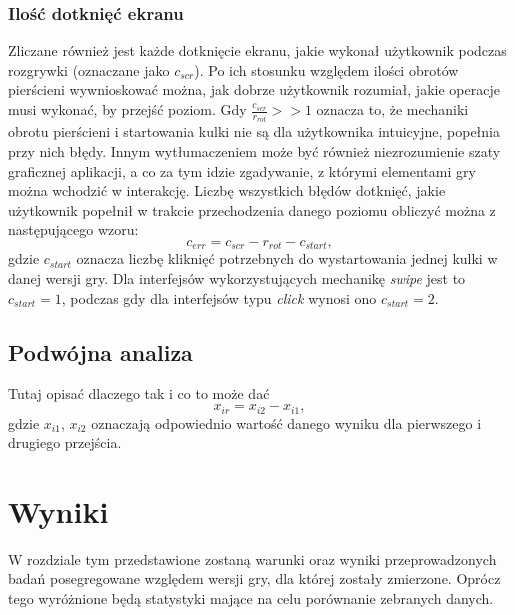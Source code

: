 \documentclass[a4paper,12pt,numbers=noenddot]{report}
\begin{document}
	\subsection{Ilość dotknięć ekranu}
Zliczane również jest każde dotknięcie ekranu, jakie wykonał użytkownik podczas rozgrywki (oznaczane jako $c_{scr}$). Po ich stosunku względem ilości obrotów pierścieni wywnioskować można, jak dobrze użytkownik rozumiał, jakie operacje musi wykonać, by przejść poziom. Gdy $\frac{c_{scr}}{r_{rot}} >> 1$ oznacza to, że mechaniki obrotu pierścieni i startowania kulki nie są dla użytkownika intuicyjne, popełnia przy nich błędy. Innym wytłumaczeniem może być również niezrozumienie szaty graficznej aplikacji, a co za tym idzie zgadywanie, z którymi elementami gry można wchodzić w interakcję. Liczbę wszystkich błędów dotknięć, jakie użytkownik popełnił w trakcie przechodzenia danego poziomu obliczyć można z następującego wzoru:
\begin{equation}
\label{eq_errors}
c_{err} = c_{scr} - r_{rot} - c_{start},
\end{equation}
gdzie  $c_{start}$ oznacza liczbę kliknięć potrzebnych do wystartowania jednej kulki w danej wersji gry. Dla interfejsów wykorzystujących mechanikę \textit{swipe} jest to $c_{start} = 1$, podczas gdy dla interfejsów typu \textit{click} wynosi ono $c_{start} = 2$.

\section{Podwójna analiza}

Tutaj opisać dlaczego tak i co to może dać
\begin{equation}
\label{eq_relative}
x_{ir} = x_{i2} - x_{i1},
\end{equation}
gdzie $x_{i1}$, $x_{i2}$ oznaczają odpowiednio wartość danego wyniku dla pierwszego i drugiego przejścia.


\chapter{Wyniki}
W rozdziale tym przedstawione zostaną warunki oraz wyniki przeprowadzonych badań posegregowane względem wersji gry, dla której zostały zmierzone. Oprócz tego wyróżnione będą statystyki mające na celu porównanie zebranych danych.
\end{document}
